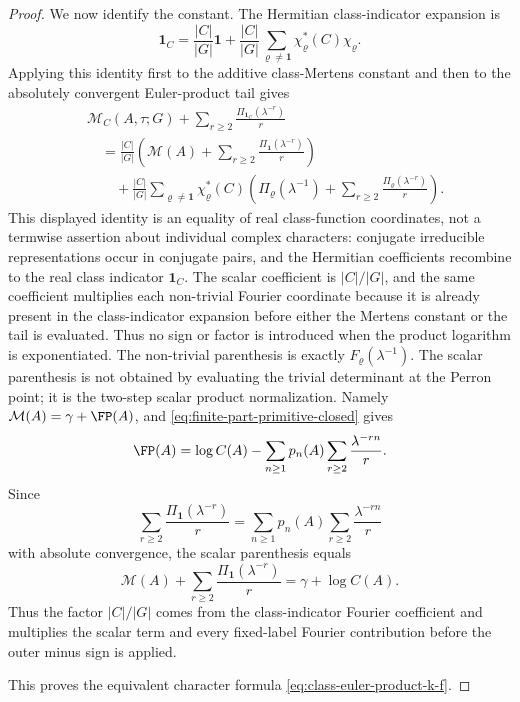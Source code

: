 \begin{proof}
  We now identify the constant.  The Hermitian
  class-indicator expansion is
  \[
    \mathbf1_C
    =
    \frac{|C|}{|G|}\mathbf1+
    \frac{|C|}{|G|}
      \sum_{\varrho\neq\mathbf1}\chi_\varrho^\ast(C)\chi_\varrho .
  \]
  Applying this identity first to the additive class-Mertens constant and
  then to the absolutely convergent Euler-product tail gives
  \[
  \begin{aligned}
    &\mathcal M_C(A,\tau;G)+
      \sum_{r\ge2}\frac{\Pi_{\mathbf1_C}(\lambda^{-r})}{r} \\
    &\quad=
      \frac{|C|}{|G|}
      \left(
        \mathcal M(A)+\sum_{r\ge2}\frac{\Pi_{\mathbf1}(\lambda^{-r})}{r}
      \right) \\
    &\qquad+
      \frac{|C|}{|G|}
      \sum_{\varrho\neq\mathbf1}\chi_\varrho^\ast(C)
      \left(
        \Pi_\varrho(\lambda^{-1})+
        \sum_{r\ge2}\frac{\Pi_\varrho(\lambda^{-r})}{r}
      \right).
  \end{aligned}
  \]
  This displayed identity is an equality of real class-function coordinates,
  not a termwise assertion about individual complex characters: conjugate
  irreducible representations occur in conjugate pairs, and the Hermitian
  coefficients recombine to the real class indicator \(\mathbf1_C\).  The
  scalar coefficient is \(|C|/|G|\), and the same coefficient multiplies each
  non-trivial Fourier coordinate because it is already present in the
  class-indicator expansion before either the Mertens constant or the tail is
  evaluated.  Thus no sign or factor is introduced when the product logarithm
  is exponentiated.
  The non-trivial parenthesis is exactly
  \(F_\varrho(\lambda^{-1})\).  The scalar parenthesis is not obtained by
  evaluating the trivial determinant at the Perron point; it is the two-step
  scalar product normalization.  Namely
  \(\mathcal M(A)=\gamma+\FP(A)\), and
  \eqref{eq:finite-part-primitive-closed} gives
  \[
    \FP(A)
    =
    \log C(A)
    -\sum_{n\ge1}p_n(A)\sum_{r\ge2}\frac{\lambda^{-rn}}{r}.
  \]
  Since
  \[
    \sum_{r\ge2}\frac{\Pi_{\mathbf1}(\lambda^{-r})}{r}
    =
    \sum_{n\ge1}p_n(A)\sum_{r\ge2}\frac{\lambda^{-rn}}{r}
  \]
  with absolute convergence, the scalar parenthesis equals
  \[
    \mathcal M(A)+\sum_{r\ge2}\frac{\Pi_{\mathbf1}(\lambda^{-r})}{r}
    =
    \gamma+\log C(A).
  \]
  Thus the factor \(|C|/|G|\) comes from the class-indicator Fourier
  coefficient and multiplies the scalar term and every fixed-label Fourier
  contribution before the outer minus sign is applied.

  This proves the equivalent character formula
  \eqref{eq:class-euler-product-k-f}.


\end{proof}
